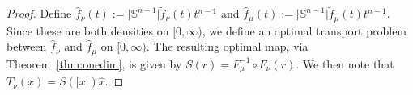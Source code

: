 \documentclass{amsart}
\theoremstyle{lemma}
\theoremstyle{remark}
\begin{document}
\begin{proof}

Define $\hat{f}_{\nu}(t):= \vert \mathbb{S}^{n-1} \vert \tilde{f}_{\nu}(t) t^{n-1}$ and $\hat{f}_{\mu}(t):= \vert \mathbb{S}^{n-1} \vert \tilde{f}_{\mu}(t) t^{n-1}$. Since these are both densities on $[0, \infty)$, we define an optimal transport problem between $\hat{f}_{\nu}$ and $\hat{f}_{\mu}$ on $[0, \infty)$. The resulting optimal map, via Theorem~\ref{thm:onedim}, is given by $S(r) = F_{\mu}^{-1} \circ F_{\nu}(r)$. We then note that $T_{\nu}(x) = S(\vert x \vert)\hat{x}$.


\end{proof}
\end{document}
